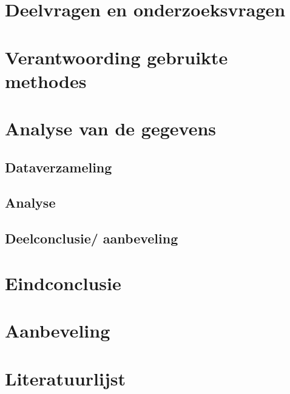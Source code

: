 \documentclass[11pt]{article}
\begin{document}
	\newpage
	
	\section{Deelvragen en onderzoeksvragen}
	
	\newpage
	
	\section{Verantwoording gebruikte methodes}
	
	\newpage
	
	\section{Analyse van de gegevens}
	\subsection{Dataverzameling}
	\subsection{Analyse}
	\subsection{Deelconclusie/ aanbeveling}
	
	\newpage
	
	\section{Eindconclusie}
	
	\newpage
	
	\section{Aanbeveling}
	
	\newpage
	
	\section{Literatuurlijst}
	
	\newpage
\end{document}
